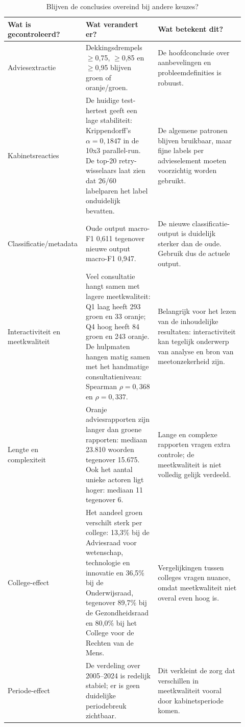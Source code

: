 \begin{table}[htbp]
\centering
\small
\caption{Blijven de conclusies overeind bij andere keuzes?}
\label{tab:dv2-robuustheid}
\begin{tabular}{p{0.26\linewidth}p{0.30\linewidth}p{0.36\linewidth}}
\hline
Wat is gecontroleerd? & Wat verandert er? & Wat betekent dit? \\
\hline
Adviesextractie & Dekkingsdrempels $\geq$0,75, $\geq$0,85 en $\geq$0,95 blijven groen of oranje/groen. & De hoofdconclusie over aanbevelingen en probleemdefinities is robuust. \\
Kabinetsreacties & De huidige test-hertest geeft een lage stabiliteit: Krippendorff's $\alpha=0{,}1847$ in de 10x3 parallel-run. De top-20 retry-wisselaars laat zien dat 26/60 labelparen het label onduidelijk bevatten. & De algemene patronen blijven bruikbaar, maar fijne labels per advieselement moeten voorzichtig worden gebruikt. \\
Classificatie/metadata & Oude output macro-F1 0,611 tegenover nieuwe output macro-F1 0,947. & De nieuwe classificatie-output is duidelijk sterker dan de oude. Gebruik dus de actuele output. \\
Interactiviteit en meetkwaliteit & Veel consultatie hangt samen met lagere meetkwaliteit: Q1 laag heeft 293 groen en 33 oranje; Q4 hoog heeft 84 groen en 243 oranje. De hulpmaten hangen matig samen met het handmatige consultatieniveau: Spearman $\rho=0{,}368$ en $\rho=0{,}337$. & Belangrijk voor het lezen van de inhoudelijke resultaten: interactiviteit kan tegelijk onderwerp van analyse en bron van meetonzekerheid zijn. \\
Lengte en complexiteit & Oranje adviesrapporten zijn langer dan groene rapporten: mediaan 23.810 woorden tegenover 15.675. Ook het aantal unieke actoren ligt hoger: mediaan 11 tegenover 6. & Lange en complexe rapporten vragen extra controle; de meetkwaliteit is niet volledig gelijk verdeeld. \\
College-effect & Het aandeel groen verschilt sterk per college: 13,3\% bij de Adviesraad voor wetenschap, technologie en innovatie en 36,5\% bij de Onderwijsraad, tegenover 89,7\% bij de Gezondheidsraad en 80,0\% bij het College voor de Rechten van de Mens. & Vergelijkingen tussen colleges vragen nuance, omdat meetkwaliteit niet overal even hoog is. \\
Periode-effect & De verdeling over 2005--2024 is redelijk stabiel; er is geen duidelijke periodebreuk zichtbaar. & Dit verkleint de zorg dat verschillen in meetkwaliteit vooral door kabinetsperiode komen. \\
\hline
\end{tabular}
\end{table}

